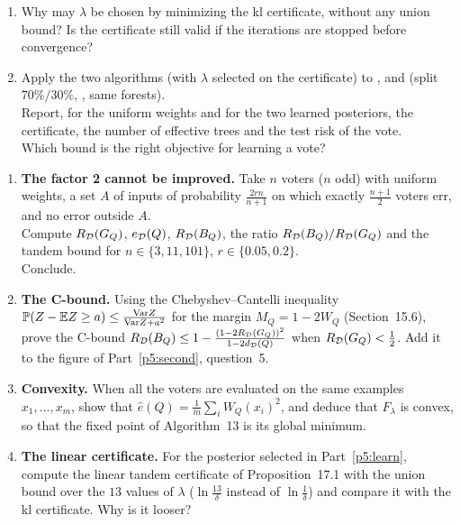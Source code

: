 \documentclass[a4paper,11pt]{article}
\begin{document}
\begin{enumerate}
      against their OOB errors for the selected $\lambda$.
\item Why may $\lambda$ be chosen by minimizing the kl certificate, without any union bound? Is the certificate still valid
      if the iterations are stopped before convergence?
\item Apply the two algorithms (with $\lambda$ selected on the certificate) to ,  and
       (split $70\%/30\%$, , same forests).\\
      Report, for the uniform weights and for the two learned posteriors, the certificate, the number of effective trees and
      the test risk of the vote.\\
      Which bound is the right objective for learning a vote?
\end{enumerate}

\label{p5:far}

\begin{enumerate}
\item \textbf{The factor 2 cannot be improved.} Take $n$ voters ($n$ odd) with uniform weights, a set $A$ of inputs of
      probability $\frac{2rn}{n+1}$ on which exactly $\frac{n+1}2$ voters err, and no error outside $A$.\\
      Compute $R_{\mathcal{D}}(G_{Q})$, $e_{\mathcal{D}}(Q)$, $R_{\mathcal{D}}(B_{Q})$, the ratio $R_{\mathcal{D}}(B_{Q})/R_{\mathcal{D}}(G_{Q})$ and the tandem bound for $n\in\{3,11,101\}$,
      $r\in\{0.05,0.2\}$.\\
      Conclude.
\item \textbf{The C-bound.} Using the Chebyshev--Cantelli inequality $\mathbb{P}(Z-\mathbb{E} Z\geq a)\leq\frac{\mathrm{Var}Z}{\mathrm{Var}Z+a^2}$
      for the margin $M_Q=1-2W_Q$ (Section~15.6), prove the C-bound $R_{\mathcal{D}}(B_{Q})\leq1-\frac{(1-2R_{\mathcal{D}}(G_{Q}))^2}{1-2d_{\mathcal{D}}(Q)}$ when
      $R_{\mathcal{D}}(G_{Q})<\frac12$. Add it to the figure of Part~\ref{p5:second}, question~5.
\item \textbf{Convexity.} When all the voters are evaluated on the same examples $x_1,\dots,x_m$, show that
      $\hat e(Q)=\frac1m\sum_iW_Q(x_i)^2$, and deduce that $F_\lambda$ is convex, so that the fixed point of
      Algorithm~13 is its global minimum.
\item \textbf{The linear certificate.} For the posterior selected in Part~\ref{p5:learn}, compute the linear tandem
      certificate of Proposition~17.1 with the union bound over the $13$ values of $\lambda$ ($\ln\frac{13}\delta$ instead
      of $\ln\frac1\delta$) and compare it with the kl certificate. Why is it looser?
\end{enumerate}
\end{document}
